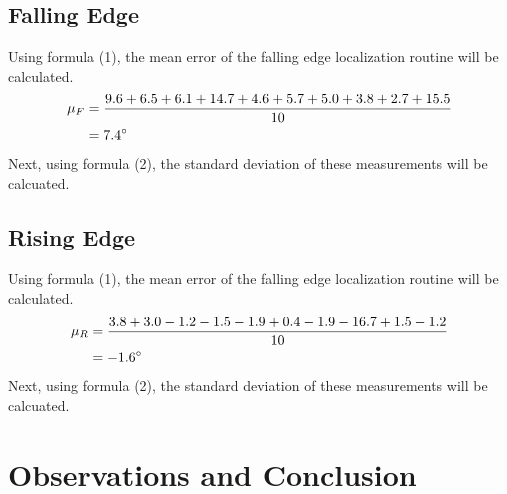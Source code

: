 \documentclass[11pt]{article}
\begin{document}
\subsection{Falling Edge}
Using formula (1), the mean error of the falling edge localization routine will be calculated.
\begin{equation*}
	\begin{aligned}
		\mu_F &= \dfrac{9.6+6.5+6.1+14.7+4.6+5.7+5.0+3.8+2.7+15.5}{10} \\
		&= 7.4 \degree
	\end{aligned}
\end{equation*}
Next, using formula (2), the standard deviation of these measurements will be calcuated.\\
\subsection{Rising Edge}
Using formula (1), the mean error of the falling edge localization routine will be calculated.
\begin{equation*}
	\begin{aligned}
		\mu_R &= \dfrac{3.8+3.0-1.2-1.5-1.9+0.4-1.9-16.7+1.5-1.2}{10} \\
		&= -1.6 \degree
	\end{aligned}
\end{equation*}
Next, using formula (2), the standard deviation of these measurements will be calcuated.\\
\section{Observations and Conclusion}
\end{document}

